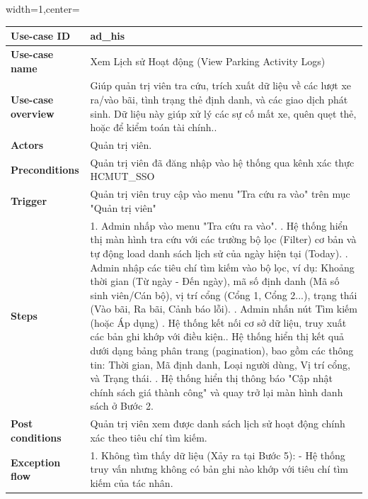\begin{adjustbox}{width=1\textwidth,center=\textwidth}
\small
\begin{tabular}{|>{\centering\arraybackslash}m{3.5cm}|m{13.2cm}|}
\hline
\textbf{Use-case ID} & ad\_his \\ \hline
\textbf{Use-case name} & Xem Lịch sử Hoạt động (View Parking Activity Logs) \\ \hline
\textbf{Use-case overview} & Giúp quản trị viên tra cứu, trích xuất dữ liệu về các lượt xe ra/vào bãi, tình trạng thẻ định danh, và các giao dịch phát sinh. Dữ liệu này giúp xử lý các sự cố mất xe, quên quẹt thẻ, hoặc để kiểm toán tài chính.. \\ \hline
\textbf{Actors} & Quản trị viên. \\ \hline
\textbf{Preconditions} & Quản trị viên đã đăng nhập vào hệ thống qua kênh xác thực HCMUT\_SSO \\ \hline
\textbf{Trigger} & Quản trị viên truy cập vào menu "Tra cứu ra vào" trên mục "Quản trị viên" \\ \hline
\textbf{Steps} & 
1. Admin nhấp vào menu "Tra cứu ra vào". \newline
2. Hệ thống hiển thị màn hình tra cứu với các trường bộ lọc (Filter) cơ bản và tự động load danh sách lịch sử của ngày hiện tại (Today). \newline
3. Admin nhập các tiêu chí tìm kiếm vào bộ lọc, ví dụ: Khoảng thời gian (Từ ngày - Đến ngày), mã số định danh (Mã số sinh viên/Cán bộ), vị trí cổng (Cổng 1, Cổng 2...), trạng thái (Vào bãi, Ra bãi, Cảnh báo lỗi). \newline
4. Admin nhấn nút Tìm kiếm (hoặc Áp dụng) \newline
5. Hệ thống kết nối cơ sở dữ liệu, truy xuất các bản ghi khớp với điều kiện.\newline
6. Hệ thống hiển thị kết quả dưới dạng bảng phân trang (pagination), bao gồm các thông tin: Thời gian, Mã định danh, Loại người dùng, Vị trí cổng, và Trạng thái. \newline
7. Hệ thống hiển thị thông báo "Cập nhật chính sách giá thành công" và quay trở lại màn hình danh sách ở Bước 2.\\ \hline
\textbf{Post conditions} & Quản trị viên xem được danh sách lịch sử hoạt động chính xác theo tiêu chí tìm kiếm.\\ \hline
\textbf{Exception flow} & 
1. Không tìm thấy dữ liệu (Xảy ra tại Bước 5): \newline
- Hệ thống truy vấn nhưng không có bản ghi nào khớp với tiêu chí tìm kiếm của tác nhân. \newline

\end{tabular}
\end{adjustbox}
